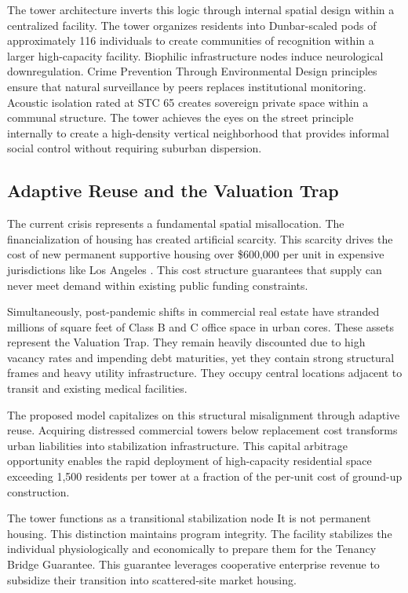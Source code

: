 \documentclass[12pt, letterpaper]{article}
\begin{document}
The tower architecture inverts this logic through internal spatial design within a centralized facility. The tower organizes residents into Dunbar-scaled pods of approximately 116 individuals to create communities of recognition within a larger high-capacity facility. Biophilic infrastructure nodes induce neurological downregulation. Crime Prevention Through Environmental Design principles ensure that natural surveillance by peers replaces institutional monitoring. Acoustic isolation rated at STC 65 creates sovereign private space within a communal structure. The tower achieves the eyes on the street principle internally to create a high-density vertical neighborhood that provides informal social control without requiring suburban dispersion.

\subsection{Adaptive Reuse and the Valuation Trap}

The current crisis represents a fundamental spatial misallocation. The financialization of housing has created artificial scarcity. This scarcity drives the cost of new permanent supportive housing over \$600,000 per unit in expensive jurisdictions like Los Angeles \citep{pacific_research_2024}. This cost structure guarantees that supply can never meet demand within existing public funding constraints.

Simultaneously, post-pandemic shifts in commercial real estate have stranded millions of square feet of Class B and C office space in urban cores. These assets represent the Valuation Trap. They remain heavily discounted due to high vacancy rates and impending debt maturities, yet they contain strong structural frames and heavy utility infrastructure. They occupy central locations adjacent to transit and existing medical facilities.

The proposed model capitalizes on this structural misalignment through adaptive reuse. Acquiring distressed commercial towers below replacement cost transforms urban liabilities into stabilization infrastructure. This capital arbitrage opportunity enables the rapid deployment of high-capacity residential space exceeding 1,500 residents per tower at a fraction of the per-unit cost of ground-up construction.

The tower functions as a transitional stabilization node It is not permanent housing. This distinction maintains program integrity. The facility stabilizes the individual physiologically and economically to prepare them for the Tenancy Bridge Guarantee. This guarantee leverages cooperative enterprise revenue to subsidize their transition into scattered-site market housing.
\end{document}
